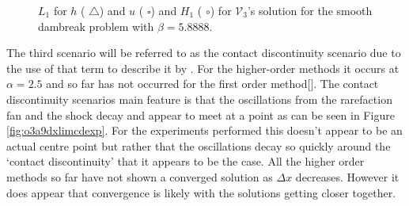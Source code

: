 \documentclass[SingleSpace,12pt,Journal]{Serre_ASCE}
\begin{document}
\begin{figure}
\centering
{}
\caption{$L_1$ for $h$ ({\color{red} $\triangle$}) and $u$ ({\color{blue} $\square$}) and $H_1$ ({\color{blue} $\circ$}) for $\mathcal{V}_3$'s solution for the smooth dambreak problem with $\beta = 5.8888$.}
\label{fig:o3a2dxlimmeasure}
\end{figure}

The third scenario will be referred to as the contact discontinuity scenario due to the use of that term to describe it by . For the higher-order methods it occurs at $\alpha = 2.5$ and so far has not occurred for the first order method[]. The contact discontinuity scenarios main feature is that the oscillations from the rarefaction fan and the shock decay and appear to meet at a point as can be seen in Figure \ref{fig:o3a9dxlimcdexp}. For the experiments performed this doesn't appear to be an actual centre point but rather that the oscillations decay so quickly around the `contact discontinuity' that it appears to be the case. All the higher order methods so far have not shown a converged solution as $\Delta x$ decreases. However it does appear that convergence is likely with the solutions getting closer together. 
\end{document}
